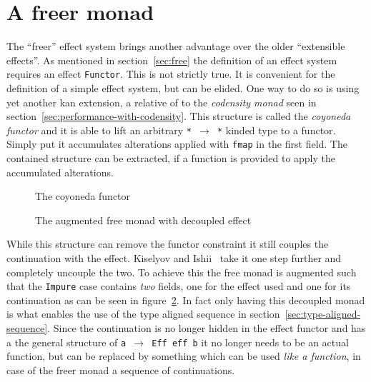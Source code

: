 \section{A freer monad}

\label{sec:freer}

The ``freer'' effect system brings another advantage over the older ``extensible
effects''. As mentioned in section~\ref{sec:free} the definition of an effect
system requires an effect \texttt{Functor}. This is not strictly true. It is
convenient for the definition of a simple effect system, but can be elided. One
way to do so is using yet another kan extension, a relative of to the
\emph{codensity monad} seen in section~\ref{sec:performance-with-codensity}.
This structure is called the \emph{coyoneda functor} and it is able to lift an
arbitrary \texttt{* $\rightarrow$ *} kinded type to a functor. Simply put it
accumulates alterations applied with \texttt{fmap} in the first field. The
contained structure can be extracted, if a function is provided to apply the
accumulated alterations.

\begin{figure}
  
  \caption{The coyoneda functor}
  \label{fig:coyoneda}
\end{figure}

\begin{figure}
  
  \caption{The augmented free monad with decoupled effect}
  \label{fig:freer-monad}
\end{figure}

While this structure can remove the functor constraint it still couples the
continuation with the effect. Kiselyov and Ishii~\cite{freer} take it one step
further and completely uncouple the two. To achieve this the free monad is
augmented such that the \texttt{Impure} case contains \emph{two} fields, one for
the effect used and one for its continuation as can be seen in
figure~\ref{fig:freer-monad}. In fact only having this decoupled monad is what
enables the use of the type aligned sequence in
section~\ref{sec:type-aligned-sequence}. Since the continuation is no longer
hidden in the effect functor and has a the general structure of \texttt{a
  $\rightarrow$ Eff eff b} it no longer needs to be an actual function, but can
be replaced by something which can be used \emph{like a function}, in case of
the freer monad a sequence of continuations.

